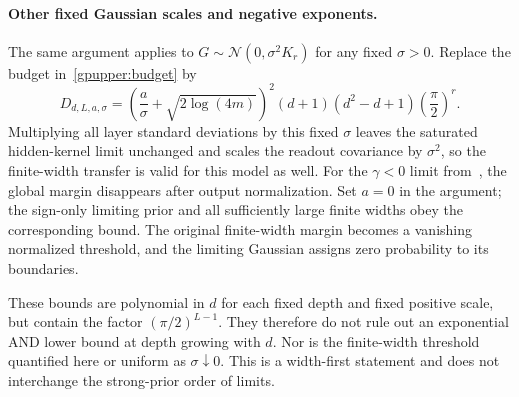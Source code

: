 \paragraph{Other fixed Gaussian scales and negative exponents.}
The same argument applies to $G\sim\mathcal N(0,\sigma^2K_r)$ for any
fixed $\sigma>0$. Replace the budget in~\eqref{gpupper:budget} by
\begin{equation}\label{gpupper:scalebudget}
 D_{d,L,a,\sigma}
 =\left(\frac a\sigma+\sqrt{2\log(4m)}\right)^2
   (d+1)(d^2-d+1)\left(\frac\pi2\right)^r.
\end{equation}
Multiplying all layer standard deviations by this fixed $\sigma$
leaves the saturated hidden-kernel limit unchanged and scales the
readout covariance by $\sigma^2$, so the finite-width transfer is valid
for this model as well. For the $\gamma<0$ limit from~\cite{nn-subcritical},
the global margin disappears after output normalization. Set $a=0$ in
the argument; the sign-only limiting prior and all sufficiently large
finite widths obey the corresponding bound. The original finite-width
margin becomes a vanishing normalized threshold, and the limiting
Gaussian assigns zero probability to its boundaries.

These bounds are polynomial in $d$ for each fixed depth and fixed
positive scale, but contain the factor $(\pi/2)^{L-1}$. They therefore
do not rule out an exponential AND lower bound at depth growing with
$d$. Nor is the finite-width threshold quantified here or uniform as
$\sigma\downarrow0$. This is a width-first statement and does not
interchange the strong-prior order of limits.
